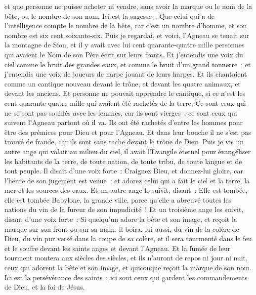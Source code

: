 \begin{multicols}{2}
et que personne ne puisse acheter ni vendre, sans avoir la marque ou le nom de la bête, ou le nombre de son nom.
Ici est la sagesse~: Que celui qui a de l'intelligence compte le nombre de la bête, car c'est un nombre d'homme, et son nombre est six cent soixante-six.
\VerseOne{}Puis je regardai, et voici, l'Agneau se tenait sur la montagne de Sion, et il y avait avec lui cent quarante-quatre mille personnes qui avaient le Nom de son Père écrit sur leurs fronts.
Et j'entendis une voix du ciel comme le bruit des grandes eaux, et comme le bruit d'un grand tonnerre~; et j'entendis une voix de joueurs de harpe jouant de leurs harpes.
Et ils chantaient comme un cantique nouveau devant le trône, et devant les quatre animaux, et devant les anciens. Et personne ne pouvait apprendre le cantique, si ce n'est les cent quarante-quatre mille qui avaient été rachetés de la terre.
Ce sont ceux qui ne se sont pas souillés avec les femmes, car ils sont vierges~; ce sont ceux qui suivent l'Agneau partout où il va. Ils ont été rachetés d'entre les hommes pour être des prémices pour Dieu et pour l'Agneau.
Et dans leur bouche il ne s'est pas trouvé de fraude, car ils sont sans tache devant le trône de Dieu.
Puis je vis un autre ange qui volait au milieu du ciel, il avait l'Evangile éternel pour évangéliser les habitants de la terre, de toute nation, de toute tribu, de toute langue et de tout peuple.
Il disait d'une voix forte~: Craignez Dieu, et donnez-lui gloire, car l'heure de son jugement est venue~; et adorez celui qui a fait le ciel et la terre, la mer et les sources des eaux.
Et un autre ange le suivit, disant~: Elle est tombée, elle est tombée Babylone, la grande ville, parce qu'elle a abreuvé toutes les nations du vin de la fureur de son impudicité~!
Et un troisième ange les suivit, disant d'une voix forte~: Si quelqu'un adore la bête et son image, et reçoit la marque sur son front ou sur sa main,
il boira, lui aussi, du vin de la colère de Dieu, du vin pur versé dans la coupe de sa colère, et il sera tourmenté dans le feu et le soufre devant les saints anges et devant l'Agneau.
Et la fumée de leur tourment montera aux siècles des siècles, et ils n'auront de repos ni jour ni nuit, ceux qui adorent la bête et son image, et quiconque reçoit la marque de son nom.
Ici est la persévérance des saints~; ici sont ceux qui gardent les commandements de Dieu, et la foi de Jésus.

\end{multicols}
